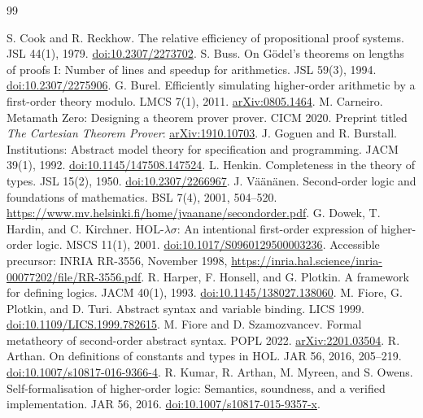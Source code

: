 \documentclass[11pt]{article}
\begin{document}
\begin{thebibliography}{99}\small\raggedright
{} S. Cook and R. Reckhow. The relative efficiency of
propositional proof systems. JSL 44(1), 1979.
\href{https://doi.org/10.2307/2273702}{doi:10.2307/2273702}.
 S. Buss. On G\"odel's theorems on lengths of proofs I:
Number of lines and speedup for arithmetics. JSL 59(3), 1994.
\href{https://doi.org/10.2307/2275906}{doi:10.2307/2275906}.
 G. Burel. Efficiently simulating higher-order arithmetic
by a first-order theory modulo. LMCS 7(1), 2011.
\href{https://arxiv.org/abs/0805.1464}{arXiv:0805.1464}.
 M. Carneiro. Metamath Zero: Designing a theorem prover
prover. CICM 2020. Preprint titled \emph{The Cartesian Theorem Prover}:
\href{https://arxiv.org/abs/1910.10703}{arXiv:1910.10703}.
 J. Goguen and R. Burstall. Institutions: Abstract
model theory for specification and programming. JACM 39(1), 1992.
\href{https://doi.org/10.1145/147508.147524}{doi:10.1145/147508.147524}.
 L. Henkin. Completeness in the theory of types.
JSL 15(2), 1950.
\href{https://doi.org/10.2307/2266967}{doi:10.2307/2266967}.
 J. V\"a\"an\"anen. Second-order logic and foundations
of mathematics. BSL 7(4), 2001, 504--520.
\url{https://www.mv.helsinki.fi/home/jvaanane/secondorder.pdf}.
 G. Dowek, T. Hardin, and C. Kirchner. HOL-$\lambda\sigma$:
An intentional first-order expression of higher-order logic. MSCS 11(1),
2001. \href{https://doi.org/10.1017/S0960129500003236}{doi:10.1017/S0960129500003236}.
Accessible precursor: INRIA RR-3556, November 1998,
\url{https://inria.hal.science/inria-00077202/file/RR-3556.pdf}.
 R. Harper, F. Honsell, and G. Plotkin. A framework for
defining logics. JACM 40(1), 1993.
\href{https://doi.org/10.1145/138027.138060}{doi:10.1145/138027.138060}.
 M. Fiore, G. Plotkin, and D. Turi. Abstract syntax and
variable binding. LICS 1999.
\href{https://doi.org/10.1109/LICS.1999.782615}{doi:10.1109/LICS.1999.782615}.
 M. Fiore and D. Szamozvancev. Formal metatheory of
second-order abstract syntax. POPL 2022.
\href{https://arxiv.org/abs/2201.03504}{arXiv:2201.03504}.
 R. Arthan. On definitions of constants and types in
HOL. JAR 56, 2016, 205--219.
\href{https://doi.org/10.1007/s10817-016-9366-4}{doi:10.1007/s10817-016-9366-4}.
 R. Kumar, R. Arthan, M. Myreen, and S. Owens.
Self-formalisation of higher-order logic: Semantics, soundness, and a
verified implementation. JAR 56, 2016.
\href{https://doi.org/10.1007/s10817-015-9357-x}{doi:10.1007/s10817-015-9357-x}.

\end{thebibliography}
\end{document}
